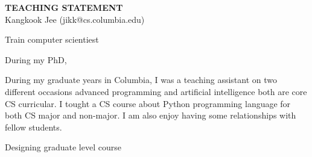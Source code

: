 \documentclass[letterpaper, 10pt]{article}
\begin{document}
\thispagestyle{fancy}

\lhead{}
\rhead{}

\renewcommand{\headrulewidth}{0pt} 
\renewcommand{\footrulewidth}{0pt} 
\fancyfoot[C]{\footnotesize \textcolor{gray}{http://www.cs.columbia.edu/$\sim$jikk/application}} 


\pagestyle{fancy}
\lhead{\textcolor{gray}{\it Kangkook Jee}}
\rhead{\textcolor{gray}{\thepage /\pageref{LastPage}}}

\begin{small}

\begin{center}
{\LARGE \bf TEACHING STATEMENT}\\
\vspace*{0.1cm}
{\normalsize Kangkook Jee (jikk@cs.columbia.edu)}
\end{center}

Train computer scientiest

During my PhD, 


During my graduate years in Columbia, I was a teaching assistant on two
different occasions advanced programming and artificial intelligence both are
core CS curricular.
%
I tought a CS course about Python programming language for both CS major and
non-major.
%
I am also enjoy having some relationships with fellow students.
%


%


Designing graduate level course 

\end{small}
\end{document}
